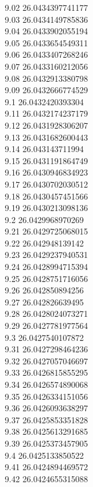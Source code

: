 {9.02	26.0434397741177\\
9.03	26.0434149785836\\
9.04	26.0433902055194\\
9.05	26.0433654549311\\
9.06	26.0433407268246\\
9.07	26.0433160212056\\
9.08	26.0432913380798\\
9.09	26.0432666774529\\
9.1	26.0432420393304\\
9.11	26.0432174237179\\
9.12	26.0431928306207\\
9.13	26.0431682600443\\
9.14	26.043143711994\\
9.15	26.0431191864749\\
9.16	26.0430946834923\\
9.17	26.0430702030512\\
9.18	26.0430457451566\\
9.19	26.0430213098136\\
9.2	26.0429968970269\\
9.21	26.0429725068015\\
9.22	26.042948139142\\
9.23	26.0429237940531\\
9.24	26.0428994715394\\
9.25	26.0428751716056\\
9.26	26.042850894256\\
9.27	26.042826639495\\
9.28	26.0428024073271\\
9.29	26.0427781977564\\
9.3	26.0427540107872\\
9.31	26.0427298464236\\
9.32	26.0427057046697\\
9.33	26.0426815855295\\
9.34	26.0426574890068\\
9.35	26.0426334151056\\
9.36	26.0426093638297\\
9.37	26.0425853351828\\
9.38	26.0425613291685\\
9.39	26.0425373457905\\
9.4	26.0425133850522\\
9.41	26.0424894469572\\
9.42	26.0424655315088\\
}
